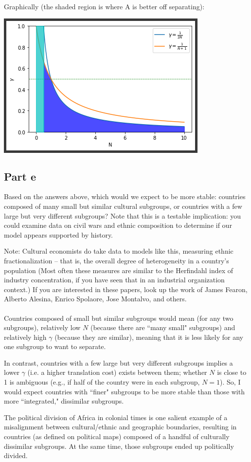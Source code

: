 \documentclass[10pt]{article}
\begin{document}
Graphically (the shaded region is where A is better off separating):

\includegraphics{culture_separate}
\newpage

\subsection*{Part e} Based on the answers above, which would we expect to be more stable: countries composed of many small but similar cultural subgroups, or countries with a few large but very different subgroups? Note that this is a testable implication: you could examine data on civil wars and ethnic composition to determine if our model appears supported by history.

Note: Cultural economists do take data to models like this, measuring ethnic fractionalization -- that is, the overall degree of heterogeneity in a country's population (Most often these measures are similar to the Herfindahl index of industry concentration, if you have seen that in an industrial organization context.) If you are interested in these papers, look up the work of James Fearon, Alberto Alesina, Enrico Spolaore, Jose Montalvo, and others. 
\\ \\
Countries composed of small but similar subgroups would mean (for any two subgroups), relatively low $N$ (because there are ``many small" subgroups) and relatively high $\gamma$ (because they are similar), meaning that it is less likely for any one subgroup to want to separate.

In contrast, countries with a few large but very different subgroups implies a lower $\gamma$ (i.e. a higher translation cost) exists between them; whether $N$ is close to 1 is ambiguous (e.g., if half of the country were in each subgroup, $N=1$).  So, I would expect countries with ``finer" subgroups to be more stable than those with more ``integrated," dissimilar subgroups.

The political division of Africa in colonial times is one salient example of a misalignment between cultural/ethnic and geographic boundaries, resulting in countries (as defined on political maps) composed of a handful of culturally dissimilar subgroups. At the same time, those subgroups ended up politically divided.
\end{document}
